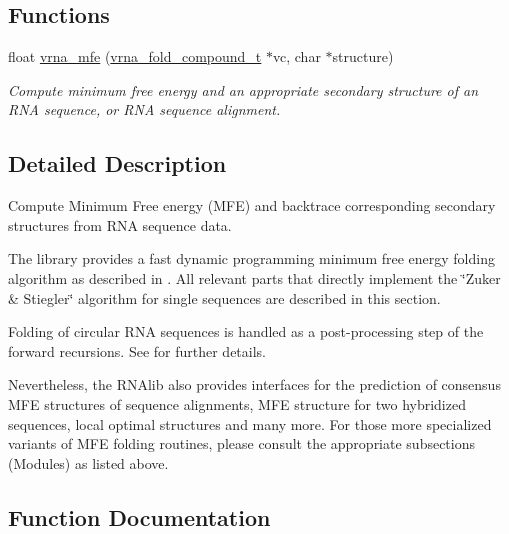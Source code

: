 \subsection*{Functions}
\begin{DoxyCompactItemize}
\item 
float \hyperlink{group__mfe__fold_gabd3b147371ccf25c577f88bbbaf159fd}{vrna\+\_\+mfe} (\hyperlink{group__fold__compound_ga1b0cef17fd40466cef5968eaeeff6166}{vrna\+\_\+fold\+\_\+compound\+\_\+t} $\ast$vc, char $\ast$structure)
\begin{DoxyCompactList}\small\item\em Compute minimum free energy and an appropriate secondary structure of an R\+NA sequence, or R\+NA sequence alignment. \end{DoxyCompactList}\end{DoxyCompactItemize}


\subsection{Detailed Description}
Compute Minimum Free energy (M\+FE) and backtrace corresponding secondary structures from R\+NA sequence data. 

The library provides a fast dynamic programming minimum free energy folding algorithm as described in \cite{zuker:1981}. All relevant parts that directly implement the \char`\"{}\+Zuker \& Stiegler\char`\"{} algorithm for single sequences are described in this section.

Folding of circular R\+NA sequences is handled as a post-\/processing step of the forward recursions. See \cite{hofacker:2006} for further details.

Nevertheless, the R\+N\+Alib also provides interfaces for the prediction of consensus M\+FE structures of sequence alignments, M\+FE structure for two hybridized sequences, local optimal structures and many more. For those more specialized variants of M\+FE folding routines, please consult the appropriate subsections (Modules) as listed above. 

\subsection{Function Documentation}
